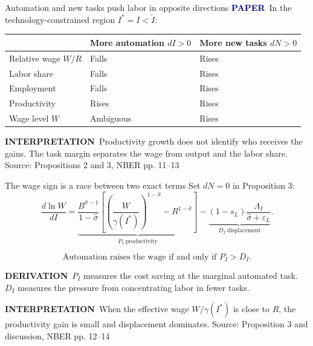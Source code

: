 \documentclass[aspectratio=169,11pt]{beamer}
\newcommand{\source}[1]{\vfill{\tiny\color{muted}Source: #1}}
\newcommand{\paper}{\textcolor{navy}{\textbf{PAPER}}}
\newcommand{\derivation}{\textcolor{rust}{\textbf{DERIVATION}}}
\newcommand{\interpretation}{\textcolor{muted}{\textbf{INTERPRETATION}}}
\begin{document}
\begin{frame}{Automation and new tasks push labor in opposite directions}
  \paper\ In the technology-constrained region $I^*=I<\widetilde I$:

  \medskip
  \begin{tabular}{>{\raggedright\arraybackslash}p{}p{}p{}}
    \toprule
     & More automation $dI>0$ & More new tasks $dN>0$ \\
    \midrule
    Relative wage $W/R$ & Falls & Rises \\
    Labor share & Falls & Rises \\
    Employment & Falls & Rises \\
    Productivity & Rises & Rises \\
    Wage level $W$ & Ambiguous & Rises \\
    \bottomrule
  \end{tabular}

  \medskip
  \interpretation\ Productivity growth does not identify who receives the gains. The task margin separates the wage from output and the labor share.
  \source{Propositions 2 and 3, NBER pp. 11--13}
\end{frame}

\begin{frame}{The wage sign is a race between two exact terms}
  Set $dN=0$ in Proposition 3:
  \[
    \frac{d\ln W}{dI}
    =
    \underbrace{\frac{B^{\widehat\sigma-1}}{1-\widehat\sigma}
    \left[\left(\frac{W}{\gamma(I^*)}\right)^{1-\widehat\sigma}-R^{1-\widehat\sigma}\right]}_{P_I\;\text{productivity}}
    -
    \underbrace{(1-s_L)\frac{\Lambda_I}{\widehat\sigma+\varepsilon_L}}_{D_I\;\text{displacement}}.
  \]

  \[
    \boxed{\text{Automation raises the wage if and only if }P_I>D_I.}
  \]

  \derivation\ $P_I$ measures the cost saving at the marginal automated task. $D_I$ measures the pressure from concentrating labor in fewer tasks.

  \interpretation\ When the effective wage $W/\gamma(I^*)$ is close to $R$, the productivity gain is small and displacement dominates.
  \source{Proposition 3 and discussion, NBER pp. 12--14}
\end{frame}
\end{document}
